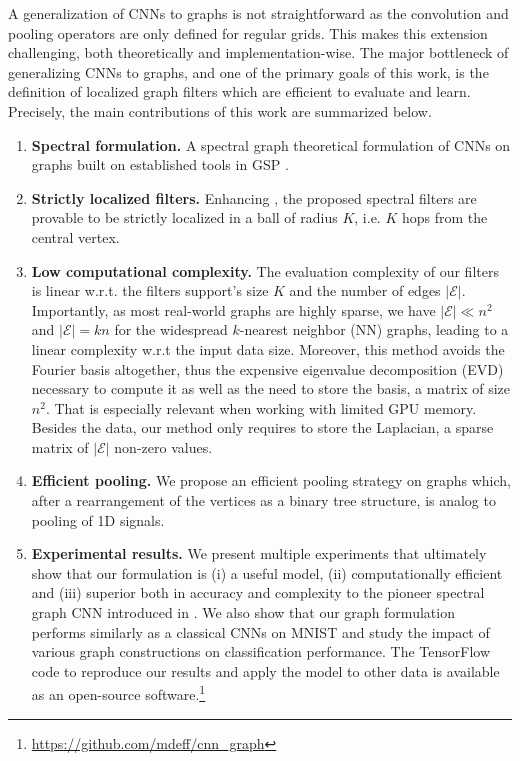\documentclass{article}
\newcommand{\E}{\mathcal{E}}
\begin{document}
A generalization of CNNs to graphs is not straightforward as the convolution
and pooling operators are only defined for regular grids. This makes this
extension challenging, both theoretically and implementation-wise. The major
bottleneck of generalizing CNNs to graphs, and one of the primary goals of this
work, is the definition of localized graph filters which are efficient to
evaluate and learn.
Precisely, the main contributions of this work are summarized below.
\begin{enumerate}
\item \textbf{Spectral formulation.} A spectral graph theoretical formulation
	of CNNs on graphs built on established tools in GSP
	\cite{art:ShumanNarangFrossardOrtegaVandergheynst13ReviewSPG}.
\item \textbf{Strictly localized filters.} Enhancing
	\cite{art:BrunaZarembaSzlamLeCun13DLgraphs}, the proposed spectral filters
	are provable to be strictly localized in a ball of radius $K$, i.e. $K$
	hops from the central vertex.  
\item \textbf{Low computational complexity.} The evaluation complexity of our
	filters is linear w.r.t. the filters support's size $K$ and the number of
	edges $|\E|$. Importantly, as most real-world graphs are highly sparse, we
	have $|\E| \ll n^2$ and $|\E| = kn$ for the widespread $k$-nearest neighbor
	(NN) graphs, leading to a linear complexity w.r.t the input data size.
	Moreover, this method avoids the Fourier basis altogether, thus the
	expensive eigenvalue decomposition (EVD) necessary to compute it as well as
	the need to store the basis, a matrix of size $n^2$. That is especially
	relevant when working with limited GPU memory. Besides the data, our method
	only requires to store the Laplacian, a sparse matrix of $|\E|$ non-zero
	values.
\item \textbf{Efficient pooling.} We propose an efficient pooling strategy on
	graphs which, after a rearrangement of the vertices as a binary tree
	structure, is analog to pooling of 1D signals.
\item \textbf{Experimental results.} We present multiple experiments that
	ultimately show that our formulation is (i) a useful model, (ii)
	computationally efficient and (iii) superior both in accuracy and
	complexity to the pioneer spectral graph CNN introduced in
	\cite{art:BrunaZarembaSzlamLeCun13DLgraphs}. We also show that our graph
	formulation performs similarly as a classical CNNs on MNIST and study the
	impact of various graph constructions on classification performance. The
	TensorFlow \cite{abadi_tensorflow_2016} code to reproduce our results and
	apply the model to other data is available as an open-source
	software.\footnote{\url{https://github.com/mdeff/cnn_graph}}
\end{enumerate}
\end{document}
